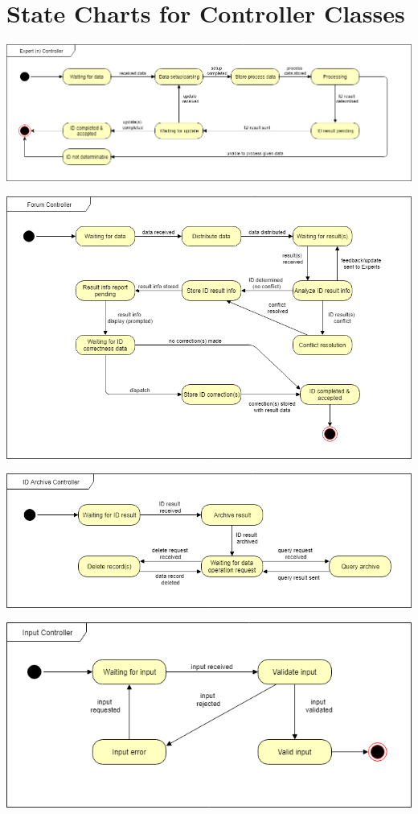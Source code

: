 \documentclass[]{article}
\begin{document}
\newpage
\section{State Charts for Controller Classes}
\label{sec:state_charts_for_controller_classes}
\begin{center}
\includegraphics[scale=0.5]{ExpertnController}
\end{center}
\begin{center}
\includegraphics[scale=0.5]{ForumController}
\end{center}
\begin{center}
\includegraphics[scale=0.5]{IDArchiveController}
\end{center}
\begin{center}
\includegraphics[scale=0.5]{InputController}
\end{center}
\end{document}
